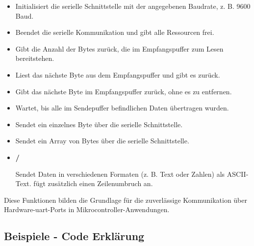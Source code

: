 \begin{itemize}
	\item \textbf{}

	 Initialisiert die serielle Schnittstelle mit der angegebenen Baudrate, z. B. 9600 Baud.

	\item \textbf{}

	 Beendet die serielle Kommunikation und gibt alle Ressourcen frei.

	\item \textbf{}

	Gibt die Anzahl der Bytes zurück, die im Empfangspuffer zum Lesen bereitstehen.

	\item \textbf{}

	 Liest das nächste Byte aus dem Empfangspuffer und gibt es zurück.

	\item \textbf{}

	 Gibt das nächste Byte im Empfangspuffer zurück, ohne es zu entfernen.

	\item \textbf{}

	 Wartet, bis alle im Sendepuffer befindlichen Daten übertragen wurden.

	\item \textbf{}

	Sendet ein einzelnes Byte über die serielle Schnittstelle.

	\item \textbf{}

	 Sendet ein Array von Bytes über die serielle Schnittstelle.

	\item \textbf{ / }

	Sendet Daten in verschiedenen Formaten (z. B. Text oder Zahlen) als ASCII-Text.  fügt zusätzlich einen Zeilenumbruch an.
\end{itemize}

Diese Funktionen bilden die Grundlage für die zuverlässige Kommunikation über Hardware-\ac{uart}-Ports in Mikrocontroller-Anwendungen. \cite{Arduino:2025HardwareSerial}

\subsection{Beispiele - Code Erklärung}

